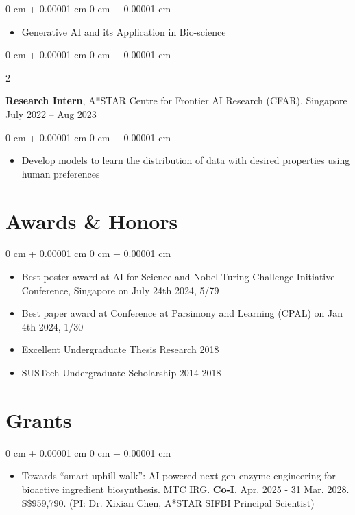 \documentclass[10pt, letterpaper]{article}
\newenvironment{highlights}{
    \begin{itemize}[
        topsep=0.10 cm,
        parsep=0.10 cm,
        partopsep=0pt,
        itemsep=0pt,
        leftmargin=0 cm + 10pt
    ]
}{
    \end{itemize}
} %
\newenvironment{onecolentry}{
    \begin{adjustwidth}{
        0 cm + 0.00001 cm
    }{
        0 cm + 0.00001 cm
    }
}{
    \end{adjustwidth}
} %
\newenvironment{twocolentry}[2][]{
    \onecolentry
    \def\secondColumn{#2}
    \setcolumnwidth{\fill, 4.5 cm}
    \begin{paracol}{2}
}{
    \switchcolumn \raggedleft \secondColumn
    \end{paracol}
    \endonecolentry
} %
\begin{document}
    \vspace{0.10 cm}
    \begin{onecolentry}
        \begin{highlights}
            \item Generative AI and its Application in Bio-science
        \end{highlights}
    \end{onecolentry}

    \vspace{0.2 cm}

    \begin{twocolentry}{
        July 2022 – Aug 2023
    }
        \textbf{Research Intern}, A*STAR Centre for Frontier AI Research (CFAR), Singapore\end{twocolentry}

    \vspace{0.10 cm}
    \begin{onecolentry}
        \begin{highlights}
            \item Develop models to learn the distribution of data with desired properties using human preferences
        \end{highlights}
    \end{onecolentry}


\section{Awards \& Honors}
    \begin{onecolentry}
        \begin{highlights}
            \item Best poster award at AI for Science and Nobel Turing Challenge Initiative Conference, Singapore on July 24th 2024, 5/79
            \item Best paper award at Conference at Parsimony and Learning (CPAL) on Jan 4th 2024, 1/30
            \item Excellent Undergraduate Thesis Research 2018
            \item SUSTech Undergraduate Scholarship 2014-2018

        \end{highlights}
    \end{onecolentry}




\section{Grants}
    \begin{onecolentry}
        \begin{highlights}
            \item Towards ``smart uphill walk'': AI powered next-gen enzyme engineering for bioactive ingredient biosynthesis. MTC IRG. \textbf{Co-I}. Apr. 2025 - 31 Mar. 2028. S\$959,790. (PI: Dr. Xixian Chen, A*STAR SIFBI Principal Scientist) 

        \end{highlights}
    \end{onecolentry}
\end{document}
